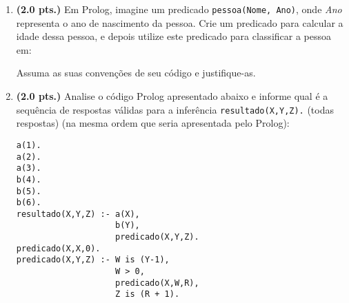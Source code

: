\documentclass[a4paper,11pt]{article}
\begin{document}
\begin{enumerate}
\begin{comment}
 Na sequência abaixo, resolva as seguintes questões:
\begin{enumerate}
\setlength{\itemsep}{-3pt}
\item {\bf (1.0 pt)} Interprete textualmente o significado de cada fórmula acima
\item {\bf (2.0 pts)} Utilizando as propriedades da LPO, PU's, PE's e regras de inferências, deduza se {\it Mickey} ama {\it Pluto}.
\end{enumerate}
\end{comment}


\item {\bf (2.0 pts.)} Em Prolog, imagine um predicado {\tt pessoa(Nome, Ano)}, onde {\it Ano} representa o ano de nascimento da pessoa. Crie um predicado para calcular a idade dessa pessoa, e depois utilize este predicado para classificar a pessoa em:
\begin{small}
\end{small}

Assuma as suas convenções de seu código e justifique-as.

\item {\bf (2.0 pts.)} Analise o código Prolog apresentado abaixo e informe qual é  a sequência de respostas válidas para a inferência {\tt resultado(X,Y,Z).} (todas respostas) 
{\small (na mesma ordem que seria apresentada pelo Prolog)}:

\begin{verbatim}
a(1).
a(2).
a(3).
b(4).
b(5).
b(6).
resultado(X,Y,Z) :- a(X), 
                    b(Y), 
                    predicado(X,Y,Z).
predicado(X,X,0).
predicado(X,Y,Z) :- W is (Y-1), 
                    W > 0,  
                    predicado(X,W,R), 
                    Z is (R + 1).
\end{verbatim}
\end{enumerate}
\end{document}
